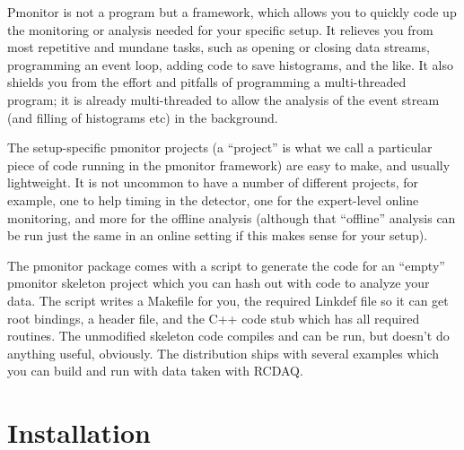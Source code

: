 \documentclass{article}[11pt]
\begin{document}
Pmonitor is not a program but a framework, which allows you to quickly
code up the monitoring or analysis needed for your specific setup.  It
relieves you from most repetitive and mundane tasks, such as opening or
closing data streams, programming an event loop, adding code to save
histograms, and the like. It also shields you from the effort and
pitfalls of programming a multi-threaded program; it is already
multi-threaded to allow the analysis of the event stream (and filling
of histograms etc) in the background. 

The setup-specific pmonitor projects (a ``project'' is what we call a
particular piece of code running in the pmonitor framework) are easy
to make, and usually lightweight. It is not uncommon to have a number
of different projects, for example, one to help timing in the
detector, one for the expert-level online monitoring, and more for the
offline analysis (although that ``offline'' analysis can be run just
the same in an online setting if this makes sense for your setup).

The pmonitor package comes with a script to generate the code for an
``empty'' pmonitor skeleton project which you can hash out with code
to analyze your data. The script writes a Makefile for you, the
required Linkdef file so it can get root bindings, a header file, and
the C++ code stub which has all required routines. The unmodified skeleton
code compiles and can be run, but doesn't do anything useful,
obviously. The distribution ships with several examples which you can
build and run with data taken with RCDAQ.

\section{Installation}
\end{document}
